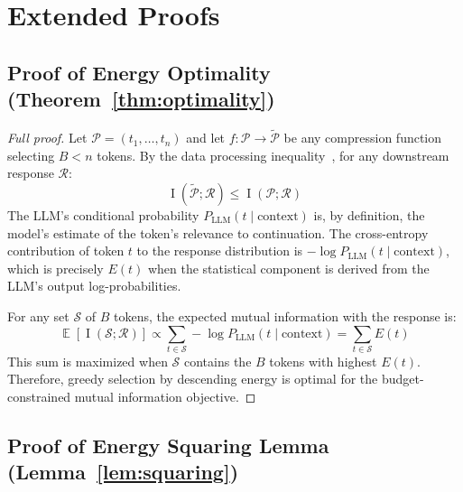 \documentclass[11pt]{article}
\theoremstyle{remark}
\DeclareMathOperator{\E}{\mathbb{E}}
\DeclareMathOperator{\MI}{I}
\begin{document}
\appendix
\section{Extended Proofs}

\subsection{Proof of Energy Optimality (Theorem~\ref{thm:optimality})}

\begin{proof}[Full proof]
Let $\mathcal{P} = (t_1, \ldots, t_n)$ and let $f: \mathcal{P} \to
\tilde{\mathcal{P}}$ be any compression function selecting $B < n$ tokens.
By the data processing inequality~\cite{cover2006}, for any downstream
response $\mathcal{R}$:
\begin{equation}
    \MI(\tilde{\mathcal{P}}; \mathcal{R}) \leq \MI(\mathcal{P}; \mathcal{R})
\end{equation}
The LLM's conditional probability $P_{\text{LLM}}(t \mid \text{context})$
is, by definition, the model's estimate of the token's relevance to
continuation. The cross-entropy contribution of token $t$ to the response
distribution is $-\log P_{\text{LLM}}(t \mid \text{context})$, which is
precisely $E(t)$ when the statistical component is derived from the LLM's
output log-probabilities.

For any set $\mathcal{S}$ of $B$ tokens, the expected mutual information
with the response is:
\begin{equation}
    \E[\MI(\mathcal{S}; \mathcal{R})] \propto \sum_{t \in \mathcal{S}}
    -\log P_{\text{LLM}}(t \mid \text{context}) = \sum_{t \in \mathcal{S}} E(t)
\end{equation}
This sum is maximized when $\mathcal{S}$ contains the $B$ tokens with
highest $E(t)$. Therefore, greedy selection by descending energy is optimal
for the budget-constrained mutual information objective.
\end{proof}

\subsection{Proof of Energy Squaring Lemma (Lemma~\ref{lem:squaring})}
\end{document}
